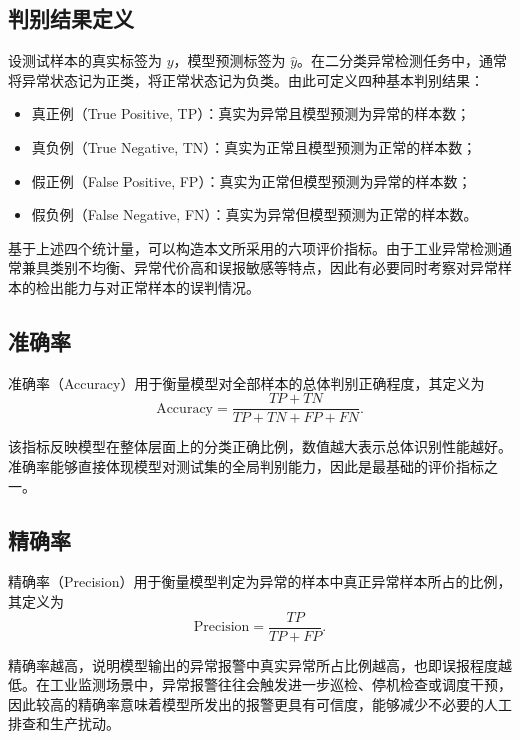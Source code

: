 \documentclass[bachelor, vlined]{DissertUESTC}
\begin{document}
    \subsection{判别结果定义}

    设测试样本的真实标签为 $y$，模型预测标签为 $\hat{y}$。在二分类异常检测任务中，通常将异常状态记为正类，将正常状态记为负类。由此可定义四种基本判别结果：
    \begin{itemize}
        \item 真正例（True Positive, TP）：真实为异常且模型预测为异常的样本数；
        \item 真负例（True Negative, TN）：真实为正常且模型预测为正常的样本数；
        \item 假正例（False Positive, FP）：真实为正常但模型预测为异常的样本数；
        \item 假负例（False Negative, FN）：真实为异常但模型预测为正常的样本数。
    \end{itemize}

    基于上述四个统计量，可以构造本文所采用的六项评价指标。由于工业异常检测通常兼具类别不均衡、异常代价高和误报敏感等特点，因此有必要同时考察对异常样本的检出能力与对正常样本的误判情况。

    \subsection{准确率}

    准确率（Accuracy）用于衡量模型对全部样本的总体判别正确程度，其定义为
    \begin{equation}
        \mathrm{Accuracy}
        =
        \frac{TP + TN}{TP + TN + FP + FN}.
    \end{equation}

    该指标反映模型在整体层面上的分类正确比例，数值越大表示总体识别性能越好。准确率能够直接体现模型对测试集的全局判别能力，因此是最基础的评价指标之一。

    \subsection{精确率}

    精确率（Precision）用于衡量模型判定为异常的样本中真正异常样本所占的比例，其定义为
    \begin{equation}
        \mathrm{Precision}
        =
        \frac{TP}{TP + FP}.
    \end{equation}

    精确率越高，说明模型输出的异常报警中真实异常所占比例越高，也即误报程度越低。在工业监测场景中，异常报警往往会触发进一步巡检、停机检查或调度干预，因此较高的精确率意味着模型所发出的报警更具有可信度，能够减少不必要的人工排查和生产扰动。
\end{document}
